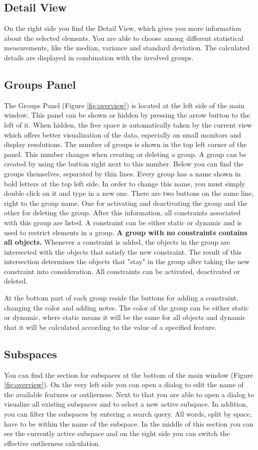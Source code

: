 \subsection{Detail View}
On the right side you find the Detail View, which gives you more information about the selected elements. You are able to choose among different statistical measurements, like the median, variance and standard deviation. The calculated details are displayed in combination with the involved groups.

\subsection{Groups Panel}
The Groups Panel (Figure \ref{fig:overview}) is located at the left side of the main window. This panel can be shown or hidden by pressing the arrow button to the left of it. When hidden, the free space is automatically taken by the current view which offers better visualization of the data, especially on small monitors and display resolutions. The number of groups is shown in the top left corner of the panel. This number changes when creating or deleting a group. A group can be created by using the button right next to this number. Below you can find the groups themselves, separated by thin lines. Every group has a name shown in bold letters at the top left side. In order to change this name, you must simply double click on it and type in a new one. There are two buttons on the same line, right to the group name. One for activating and deactivating the group and the other for deleting the group.
After this information, all constraints associated with this group are listed. A constraint can be either static or dynamic and is used to restrict elements in a group.
\textbf{A group with no constraints contains all objects.}
Whenever a constraint is added, the objects in the group are intersected with the objects that satisfy the new constraint. The result of this intersection determines the objects that "stay" in the group after taking the new constraint into consideration. All constraints can be activated, deactivated or deleted.

At the bottom part of each group reside the buttons for adding a constraint, changing the color and adding notes. The color of the group can be either static or dynamic, where static means it will be the same for all objects and dynamic that it will be calculated according to the value of a specified feature.

\subsection{Subspaces}
You can find the section for subspaces at the bottom of the main window (Figure \ref{fig:overview}). On the very left side you can open a dialog to edit the name of the available features or outlierness. Next to that you are able to open a dialog to visualize all existing subspaces and to select a new active subspace. In addition, you can filter the subspaces by entering a search query. All words, split by space, have to be within the name of the subspace. In the middle of this section you can see the currently active subspace and on the right side you can switch the effective outlierness calculation.

